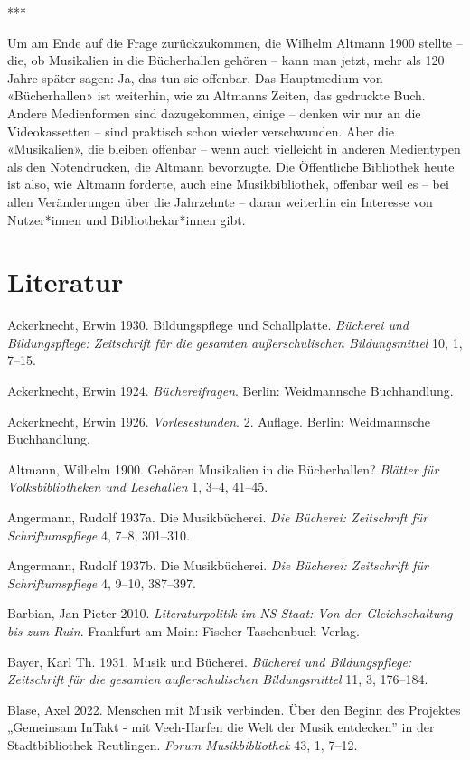 \documentclass[a4paper,
fontsize=11pt,
oneside,
numbers=noperiodatend,
parskip=half-,
bibliography=totoc,
final
]{scrartcl}
\begin{document}
***

Um am Ende auf die Frage zurückzukommen, die Wilhelm Altmann 1900
stellte -- die, ob Musikalien in die Bücherhallen gehören -- kann man
jetzt, mehr als 120 Jahre später sagen: Ja, das tun sie offenbar. Das
Hauptmedium von «Bücherhallen» ist weiterhin, wie zu Altmanns Zeiten,
das gedruckte Buch. Andere Medienformen sind dazugekommen, einige --
denken wir nur an die Videokassetten -- sind praktisch schon wieder
verschwunden. Aber die «Musikalien», die bleiben offenbar -- wenn auch
vielleicht in anderen Medientypen als den Notendrucken, die Altmann
bevorzugte. Die Öffentliche Bibliothek heute ist also, wie Altmann
forderte, auch eine Musikbibliothek, offenbar weil es -- bei allen
Veränderungen über die Jahrzehnte -- daran weiterhin ein Interesse von
Nutzer*innen und Bibliothekar*innen gibt.

\hypertarget{literatur}{%
\section{Literatur}\label{literatur}}

Ackerknecht, Erwin 1930. Bildungspflege und Schallplatte. \emph{Bücherei
und Bildungspflege: Zeitschrift für die gesamten außerschulischen
Bildungsmittel} 10, 1, 7--15.

Ackerknecht, Erwin 1924. \emph{Büchereifragen}. Berlin: Weidmannsche
Buchhandlung.

Ackerknecht, Erwin 1926. \emph{Vorlesestunden}. 2. Auflage. Berlin:
Weidmannsche Buchhandlung.

Altmann, Wilhelm 1900. Gehören Musikalien in die Bücherhallen?
\emph{Blätter für Volksbibliotheken und Lesehallen} 1, 3--4, 41--45.

Angermann, Rudolf 1937a. Die Musikbücherei. \emph{Die Bücherei:
Zeitschrift für Schriftumspflege} 4, 7--8, 301--310.

Angermann, Rudolf 1937b. Die Musikbücherei. \emph{Die Bücherei:
Zeitschrift für Schriftumspflege} 4, 9--10, 387--397.

Barbian, Jan-Pieter 2010. \emph{Literaturpolitik im NS-Staat: Von der
Gleichschaltung bis zum Ruin}. Frankfurt am Main: Fischer Taschenbuch
Verlag.

Bayer, Karl Th. 1931. Musik und Bücherei. \emph{Bücherei und
Bildungspflege: Zeitschrift für die gesamten außerschulischen
Bildungsmittel} 11, 3, 176--184.

Blase, Axel 2022. Menschen mit Musik verbinden. Über den Beginn des
Projektes „Gemeinsam InTakt - mit Veeh-Harfen die Welt der Musik
entdecken'' in der Stadtbibliothek Reutlingen. \emph{Forum
Musikbibliothek} 43, 1, 7--12.
\end{document}
